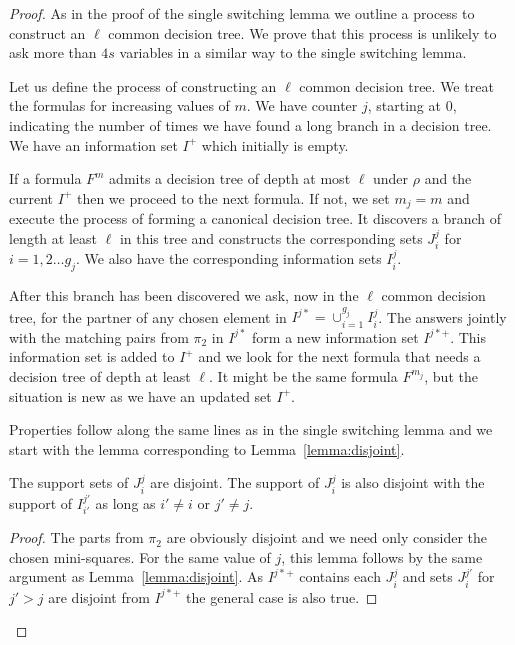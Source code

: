 \documentclass{theoretics}
\begin{document}
\begin{proof}
As in the proof of the single switching lemma 
we outline a process to construct an $\ell$ common decision tree.
We prove that this process is unlikely to ask more than
$4s$ variables in a similar way to the single switching
lemma.

Let us define the process of constructing an $\ell$ common
decision tree.  
We treat the formulas for increasing values of $m$.
We have counter $j$, starting at $0$, indicating the number
of times we have found a long branch in a decision tree.  
We have an information set $I^+$ which initially is empty.

If a formula $F^m$ admits
a decision tree of depth at most $\ell$ under $\rho$ and
the current $I^+$ then we proceed
to the next formula.  
If not, we set $m_j=m$ and
execute the process of forming a canonical
decision tree.  It discovers a branch of length at least
$\ell$ in this tree and constructs
the corresponding sets $J_i^j$ for $i=1, 2 \ldots g_j$.
We also have the corresponding information sets $I_i^j$.  

After this branch has been discovered we ask, now
in the $\ell$ common decision tree, for the
partner of any chosen element in $I^{j*}= \cup_{i=1}^{g_j} I_i^j$.
The answers jointly with the matching pairs from $\pi_2$ in 
$I^{j*}$ form a new information set $I^{j*+}$.
This information set is added to $I^+$ and we
look for the next formula that needs a decision
tree of depth at least $\ell$.  It might be the
same formula $F^{m_j}$, but the situation is new as
we have an updated set $I^+$.

Properties follow along the same lines as in the
single switching lemma and we start with the lemma
corresponding to Lemma~\ref{lemma:disjoint}.

\begin{lemma}\label{lemma:mdisjoint}
The support sets of $J_i^j$ are disjoint.  The support of
$J_i^j$ is also disjoint with the support of $I_{i'}^{j'}$ as
long as $i'\not= i$ or $j'\not= j$.
\end{lemma}

\begin{proof}
The parts from $\pi_2$ are obviously disjoint and
we need only consider the chosen mini-squares.
For the same value of $j$, this lemma follows by the
same argument as Lemma~\ref{lemma:disjoint}.  As $I^{j*+}$
contains each $J^{j}_i$ and sets $J_i^{j'}$ for $j'> j$ are
disjoint from $I^{j*+}$ the general case is
also true.
\end{proof}


\end{proof}
\end{document}
